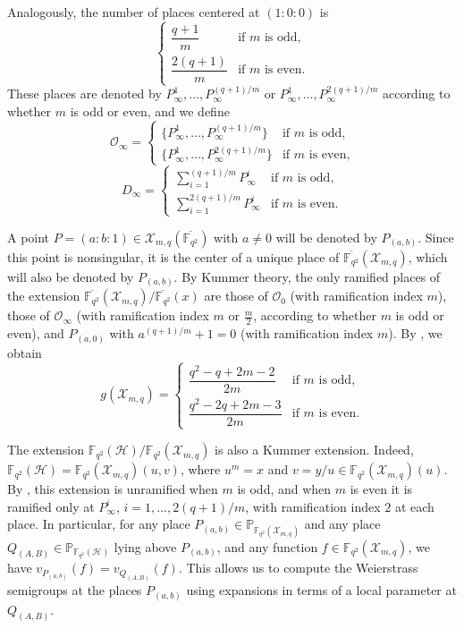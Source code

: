 \documentclass[12pt]{amsart}
\theoremstyle{remark}
\theoremstyle{definition}
\begin{document}
Analogously, the number of places centered at $(1:0:0)$ is
$$\begin{cases}
    \dfrac{q+1}{m} & \text{if } m \text{ is odd,} \\[6pt]
    \dfrac{2(q+1)}{m} & \text{if } m \text{ is even.}
\end{cases}$$
These places are denoted by $P_{\infty}^1, \ldots, P_{\infty}^{(q+1)/m}$ 
or $P_{\infty}^1, \ldots, P_{\infty}^{2(q+1)/m}$ according to whether 
$m$ is odd or even, and we define
$$\mathcal{O}_{\infty} = \begin{cases}
    \{P_{\infty}^1, \ldots, P_{\infty}^{(q+1)/m}\} & \text{if } m 
    \text{ is odd,} \\[4pt]
    \{P_{\infty}^1, \ldots, P_{\infty}^{2(q+1)/m}\} & \text{if } m 
    \text{ is even,}
\end{cases}$$
$$D_{\infty} = \begin{cases}
    \displaystyle\sum_{i=1}^{(q+1)/m}P_{\infty}^i & \text{if } m 
    \text{ is odd,} \\[6pt]
    \displaystyle\sum_{i=1}^{2(q+1)/m}P_{\infty}^i & \text{if } m 
    \text{ is even.}
\end{cases}$$

A point $P=(a:b:1) \in \mathcal{X}_{m,q}(\overline{\mathbb{F}_{q^2}})$ 
with $a \neq 0$ will be denoted by $P_{(a,b)}$. Since this point is 
nonsingular, it is the center of a unique place of 
$\overline{\mathbb{F}_{q^2}}(\mathcal{X}_{m,q})$, which will also be 
denoted by $P_{(a,b)}$. By Kummer theory, the only ramified places of 
the extension 
$\overline{\mathbb{F}_{q^2}}(\mathcal{X}_{m,q})/\overline{\mathbb{F}_{q^2}}(x)$ 
are those of $\mathcal{O}_0$ (with ramification index $m$), those of 
$\mathcal{O}_{\infty}$ (with ramification index $m$ or $\frac{m}{2}$, 
according to whether $m$ is odd or even), and $P_{(a,0)}$ with 
$a^{(q+1)/m}+1 = 0$ (with ramification index $m$). By 
\cite[Proposition~3.7.3]{stichtenoth}, we obtain
$$g(\mathcal{X}_{m,q}) = \begin{cases}
    \dfrac{q^2-q+2m-2}{2m} & \text{if } m \text{ is odd,} \\[6pt]
    \dfrac{q^2-2q+2m-3}{2m} & \text{if } m \text{ is even.}
\end{cases}$$

The extension 
$\mathbb{F}_{q^2}(\mathcal{H})/\mathbb{F}_{q^2}(\mathcal{X}_{m,q})$ 
is also a Kummer extension. Indeed, 
$\mathbb{F}_{q^2}(\mathcal{H}) = \mathbb{F}_{q^2}(\mathcal{X}_{m,q})(u,v)$, 
where $u^m = x$ and $v = y/u \in \mathbb{F}_{q^2}(\mathcal{X}_{m,q})(u)$. 
By \cite[Proposition~3.7.3]{stichtenoth}, this extension is unramified 
when $m$ is odd, and when $m$ is even it is ramified only at 
$P_{\infty}^i$, $i = 1, \ldots, 2(q+1)/m$, with ramification index 
$2$ at each place. In particular, for any place 
$P_{(a,b)} \in \mathbb{P}_{\mathbb{F}_{q^2}(\mathcal{X}_{m,q})}$ and 
any place $Q_{(A,B)} \in \mathbb{P}_{\mathbb{F}_{q^2}(\mathcal{H})}$ 
lying above $P_{(a,b)}$, and any function 
$f \in \mathbb{F}_{q^2}(\mathcal{X}_{m,q})$, we have 
$v_{P_{(a,b)}}(f) = v_{Q_{(A,B)}}(f)$. This allows us to compute the 
Weierstrass semigroups at the places $P_{(a,b)}$ using expansions in 
terms of a local parameter at $Q_{(A,B)}$.
\end{document}

